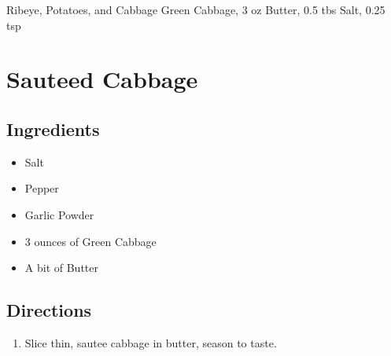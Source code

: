 Ribeye, Potatoes, and Cabbage
  Green Cabbage, 3 oz
  Butter, 0.5 tbs
  Salt, 0.25 tsp

\section{ Sauteed Cabbage }

\subsection{ Ingredients }

\begin{itemize}
  \item Salt
  \item Pepper
  \item Garlic Powder
  \item 3 ounces of Green Cabbage
  \item A bit of Butter
\end{itemize}

\subsection{ Directions }

\begin{enumerate}
  \item Slice thin, sautee cabbage in butter, season to taste. 
\end{enumerate}

